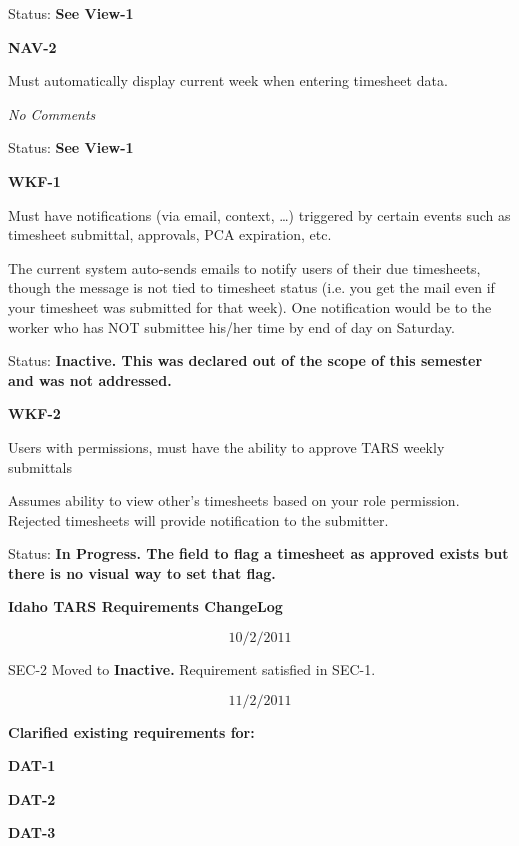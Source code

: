 \documentclass{article}
\begin{document}
Status: \textbf{See View-1}\textit{}

\noindent 

\noindent \textbf{NAV-2}

\noindent Must automatically display current week when entering timesheet data.

 \textit{No Comments }

\textit{ }Status: \textbf{See View-1}\textit{}

\noindent 

\noindent \textbf{WKF-1}

\noindent Must have notifications (via email, context, \dots ) triggered by certain events such as timesheet submittal, approvals, PCA expiration, etc.

\noindent The current system auto-sends emails to notify users of their due timesheets, though the message is not tied to timesheet status (i.e. you get the mail even if your timesheet was submitted for that week). One notification would be to the worker who has NOT submittee his/her time by end of day on Saturday.

\noindent Status: \textbf{Inactive.  This was declared out of the scope of this semester and was not addressed.}

\noindent 

\noindent \textbf{WKF-2}

\noindent Users with permissions, must have the ability to approve TARS weekly submittals

\noindent Assumes ability to view other's timesheets based on your role permission. Rejected timesheets will provide notification to the submitter.

\noindent Status: \textbf{In Progress.  The field to flag a timesheet as approved exists but there is no visual way to set that flag.}

\noindent 

\noindent 

\noindent \textbf{Idaho TARS Requirements ChangeLog}

\noindent 
\[10/2/2011\] 

 SEC-2 Moved to \textbf{Inactive. }Requirement satisfied in SEC-1.

\noindent 
\[11/2/2011\] 

 \textbf{Clarified existing requirements for:}

\textbf{  DAT-1}

\textbf{  DAT-2}

\textbf{  DAT-3}
\end{document}
